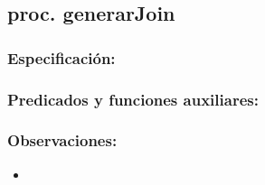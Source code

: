 \subsection{proc. generarJoin}
    \subsubsection{Especificaci\'on:}    
    \subsubsection{Predicados y funciones auxiliares:}
    \subsubsection{Observaciones:}
        \begin{itemize}
            \item
        \end{itemize}